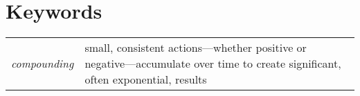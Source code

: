 \section*{Keywords}
\begin{tabularx}{\textwidth}{ l X }
    \textit{compounding} & small, consistent actions—whether positive or negative—accumulate over time to create significant, often exponential, results \\ 
\end{tabularx}
